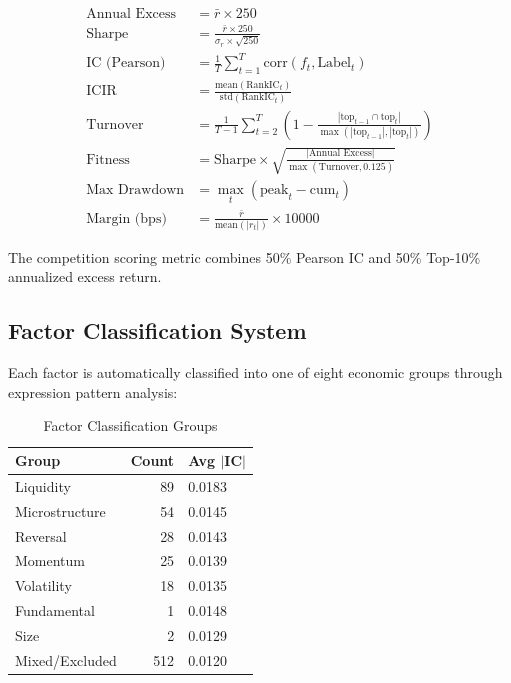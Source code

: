 \documentclass[11pt,a4paper]{ctexart}
\begin{document}
\begin{align}
\text{Annual Excess} &= \bar{r} \times 250 \\
\text{Sharpe} &= \frac{\bar{r} \times 250}{\sigma_r \times \sqrt{250}} \\
\text{IC (Pearson)} &= \frac{1}{T}\sum_{t=1}^T \text{corr}(f_t, \text{Label}_t) \\
\text{ICIR} &= \frac{\text{mean}(\text{RankIC}_t)}{\text{std}(\text{RankIC}_t)} \\
\text{Turnover} &= \frac{1}{T-1}\sum_{t=2}^T \left(1 - \frac{|\text{top}_{t-1} \cap \text{top}_t|}{\max(|\text{top}_{t-1}|, |\text{top}_t|)}\right) \\
\text{Fitness} &= \text{Sharpe} \times \sqrt{\frac{|\text{Annual Excess}|}{\max(\text{Turnover}, 0.125)}} \\
\text{Max Drawdown} &= \max_{t} (\text{peak}_t - \text{cum}_t) \\
\text{Margin (bps)} &= \frac{\bar{r}}{\text{mean}(|r_t|)} \times 10000
\end{align}

The competition scoring metric combines 50\% Pearson IC and 50\% Top-10\% annualized excess return.

\subsection{Factor Classification System}

Each factor is automatically classified into one of eight economic groups through expression pattern analysis:

\begin{table}[H]
\centering
\caption{Factor Classification Groups}
\begin{tabular}{lrl}
\toprule
\textbf{Group} & \textbf{Count} & \textbf{Avg $|$IC$|$} \\
\midrule
Liquidity & 89 & 0.0183 \\
Microstructure & 54 & 0.0145 \\
Reversal & 28 & 0.0143 \\
Momentum & 25 & 0.0139 \\
Volatility & 18 & 0.0135 \\
Fundamental & 1  & 0.0148 \\
Size & 2  & 0.0129 \\
Mixed/Excluded & 512 & 0.0120 \\
\bottomrule
\end{tabular}
\end{table}
\end{document}
